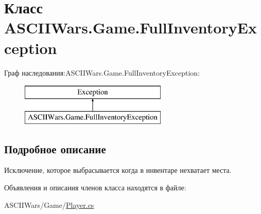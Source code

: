 \hypertarget{class_a_s_c_i_i_wars_1_1_game_1_1_full_inventory_exception}{}\section{Класс A\+S\+C\+I\+I\+Wars.\+Game.\+Full\+Inventory\+Exception}
\label{class_a_s_c_i_i_wars_1_1_game_1_1_full_inventory_exception}
Граф наследования\+:A\+S\+C\+I\+I\+Wars.\+Game.\+Full\+Inventory\+Exception\+:\begin{figure}[H]
\begin{center}
\leavevmode
\includegraphics[height=2.000000cm]{class_a_s_c_i_i_wars_1_1_game_1_1_full_inventory_exception}
\end{center}
\end{figure}


\subsection{Подробное описание}
Исключение, которое выбрасывается когда в инвентаре нехватает места. 

Объявления и описания членов класса находятся в файле\+:\begin{DoxyCompactItemize}
\item 
A\+S\+C\+I\+I\+Wars/\+Game/\hyperlink{_player_8cs}{Player.\+cs}\end{DoxyCompactItemize}
